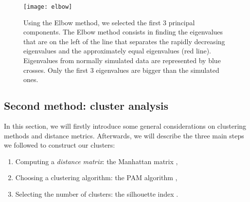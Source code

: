\begin{figure}
\centering
\captionsetup{singlelinecheck = false, format= hang, justification=raggedright, font=small, labelsep=space}
\texttt{[image: elbow]}
  \label{fig:elbow}
\begin{flushleft}
{\footnotesize  Using the Elbow method, we selected the first 3 principal components. The Elbow method consists in finding the eigenvalues that are on the left of the line that separates the rapidly decreasing eigenvalues and the approximately equal eigenvalues (red line). Eigenvalues from normally simulated data are represented by blue crosses. Only the first 3 eigenvalues are bigger than the simulated ones.}
\end{flushleft}
\end{figure}


\subsection{Second method: cluster analysis}
In this section, we will firstly introduce some general considerations on clustering methods and distance metrics. Afterwards, we will describe the three main steps we followed to construct our clusters:
\begin{enumerate}
\item Computing a \emph{distance matrix}: the Manhattan matrix \cite{hennig_handbook_2016},
\item Choosing a clustering algorithm: the PAM algorithm \cite{hennig_handbook_2016},
\item Selecting the number of clusters: the silhouette index \cite{hennig_handbook_2016,kaufman_finding_1990}.
\end{enumerate}

